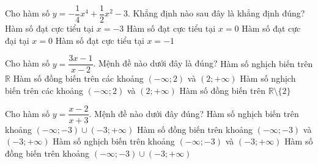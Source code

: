 \begin{ex}%
	Cho hàm số $ y = - \dfrac{1}{4}x^4 + \dfrac{1}{2}x^2 - 3 $. Khẳng định nào sau đây là khẳng định đúng?
	\choice
	{Hàm số đạt cực tiểu tại $ x = -3 $}
	{ \True Hàm số đạt cực tiểu tại $ x = 0 $}
	{Hàm số đạt cực đại tại $ x = 0 $}
	{Hàm số đạt cực tiểu tại $ x = -1 $}
\end{ex} 

\begin{ex}
	Cho hàm số $y=\dfrac{3x-1}{x-2}$. Mệnh đề nào dưới đây là đúng?
	\choice
	{Hàm số nghịch biến trên $\mathbb{R}$}
	{Hàm số đồng biến trên các khoảng $(-\infty;2)$ và $(2;+\infty)$}
	{\True Hàm số nghịch biến trên các khoảng $(-\infty;2)$ và $(2;+\infty)$}
	{Hàm số đồng biến trên $\mathbb{R}\setminus\{2\}$}
	
\end{ex} 

\begin{ex}
	Cho hàm số $y=\dfrac{x-2}{x+3}$. Mệnh đề nào dưới đây đúng?
	\choice
	{Hàm số nghịch biến trên khoảng $(-\infty;-3)\cup (-3;+\infty) $}
	{\True Hàm số đồng biến trên khoảng $(-\infty;-3) $ và $(-3;+\infty)$}
	{Hàm số nghịch biến trên khoảng $(-\infty;-3)$ và $(-3;+\infty)$}
	{Hàm số đồng biến trên khoảng $(-\infty;-3)\cup (-3;+\infty) $}
\end{ex} 

